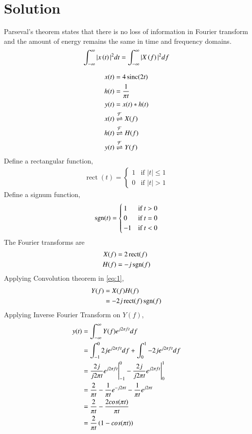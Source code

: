 \documentclass[journal,12pt,twocolumn]{IEEEtran}
\DeclareMathOperator{\sinc}{sinc}
\DeclareMathOperator{\rect}{rect}
\begin{document}
\section*{Solution}
\begin{lemma}
Parseval's theorem states that there is no loss of information in Fourier transform and the amount of energy remains the same in time and frequency domains.
\begin{align}
    \int_{-\infty}^{\infty} |x\left(t\right)|^{2} dt = \int_{-\infty}^{\infty} |X\left(f\right)|^{2} df
\end{align}
\end{lemma}
\begin{align}
    x(t) &= 4\sinc(2t)\\
    h(t) &= \frac{1}{\pi t}\\
    y(t) &= x(t) * h(t) \label{eq:1}\\
    x(t) &\fourier{X(f)}\\
    h(t) &\fourier{H(f)}\\
    y(t) &\fourier{Y(f)}
\end{align}
Define a rectangular function,
\begin{align}
    \rect(t) =
    \begin{cases}
    1 & \text{if } |t| \leq 1\\
    0 & \text{if } |t| > 1
    \end{cases}
\end{align}
Define a signum function,
\begin{align}
    \mathop{\mathrm{sgn}}(t) =
    \begin{cases}
    1 & \text{if } t > 0\\
    0 & \text{if } t = 0\\
    -1 & \text{if } t < 0
    \end{cases}
\end{align}
The Fourier transforms are
\begin{align}
    X(f) &= 2\rect(f)\\
    H(f) &= -j\sgn(f)
\end{align}
Applying Convolution theorem in \eqref{eq:1},
\begin{align}
    Y(f) &= X(f)H(f)\\
    &= -2j\rect(f)\sgn(f)
\end{align}
Applying Inverse Fourier Transform on $Y(f)$,
\begin{align}
    y(t) &= \int_{-\infty}^{\infty} Y(f)e^{j2\pi ft}df\\
    &= \int_{-1}^{0} 2je^{j2\pi ft}df + \int_{0}^{1} -2je^{j2\pi ft}df\\
    &= \frac{2j}{j2\pi t}e^{j2\pi ft}\Biggr|_{-1}^{0} - \frac{2j}{j2\pi t}e^{j2\pi ft}\Biggr|_{0}^{1}\\
    &= \frac{2}{\pi t} -\frac{1}{\pi t}e^{-j2\pi t} - \frac{1}{\pi t}e^{j2\pi t}\\
    &= \frac{2}{\pi t} - \frac{2cos(\pi t)}{\pi t}\\
    &= \frac{2}{\pi t}\left(1 - cos(\pi t)\right)
\end{align}
\end{document}
